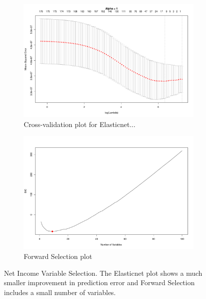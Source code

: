 \documentclass{article}
\begin{document}
\begin{figure}[!tbp]
\begin{subfigure}[b]{0.5\textwidth}
\includegraphics[width=\textwidth]{elastic_cv_netincome.pdf}
\caption{Cross-validation plot for Elasticnet...}
\end{subfigure}
\hfill
\begin{subfigure}[b]{0.5\textwidth}
\includegraphics[width=\textwidth]{forward_nvars_netincome.pdf}
\caption{Forward Selection plot}
\end{subfigure}
\caption{Net Income Variable Selection. The Elasticnet plot shows a much smaller improvement in prediction error and Forward Selection includes a small number of variables.}
\label{figure:netincome_opt}
\end{figure}
\end{document}
